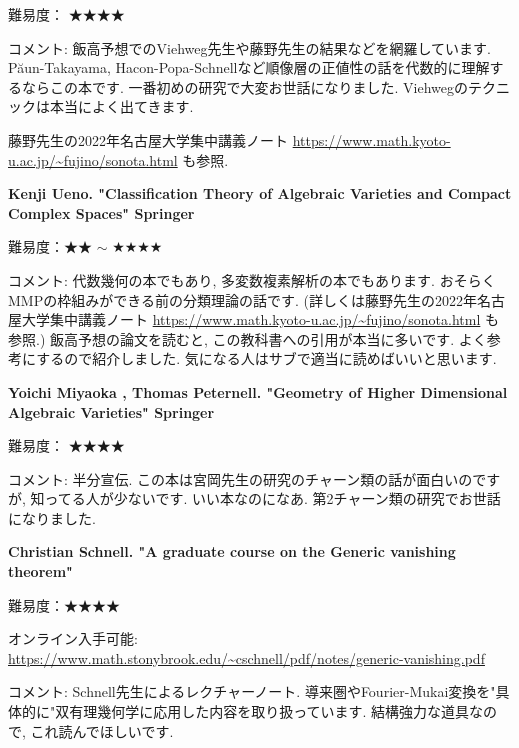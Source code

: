 難易度： ★★★★\vspace{-6pt} 

コメント: 飯高予想でのViehweg先生や藤野先生の結果などを網羅しています. P\u{a}un-Takayama, Hacon-Popa-Schnellなど順像層の正値性の話を代数的に理解するならこの本です.  
一番初めの研究で大変お世話になりました. Viehwegのテクニックは本当によく出てきます. 

藤野先生の2022年名古屋大学集中講義ノート \url{https://www.math.kyoto-u.ac.jp/~fujino/sonota.html} も参照. 
\vspace{8pt}


\textbf{Kenji Ueno. "Classification Theory of Algebraic Varieties and Compact Complex Spaces" Springer}  　\vspace{-6pt} 

難易度：★★ $\sim$ ★★★★  　\vspace{-6pt} 

コメント: 代数幾何の本でもあり, 多変数複素解析の本でもあります. おそらくMMPの枠組みができる前の分類理論の話です. (詳しくは藤野先生の2022年名古屋大学集中講義ノート \url{https://www.math.kyoto-u.ac.jp/~fujino/sonota.html} も参照.) 
飯高予想の論文を読むと, この教科書への引用が本当に多いです. 
よく参考にするので紹介しました. 気になる人はサブで適当に読めばいいと思います. 
\vspace{8pt}

\textbf{Yoichi Miyaoka , Thomas Peternell. "Geometry of Higher Dimensional Algebraic Varieties" Springer} \vspace{-6pt}

難易度： ★★★★\vspace{-6pt} 

コメント: 半分宣伝. この本は宮岡先生の研究のチャーン類の話が面白いのですが, 知ってる人が少ないです. いい本なのになあ. 第2チャーン類の研究でお世話になりました. 

\textbf{Christian Schnell. "A graduate course on the Generic vanishing theorem" }  \vspace{-6pt} 

難易度：★★★★\vspace{-6pt} 

オンライン入手可能: \url{https://www.math.stonybrook.edu/~cschnell/pdf/notes/generic-vanishing.pdf} \vspace{-6pt} 

コメント: Schnell先生によるレクチャーノート. 導来圏やFourier-Mukai変換を"具体的に"双有理幾何学に応用した内容を取り扱っています. 結構強力な道具なので, これ読んでほしいです. 
\vspace{8pt}


